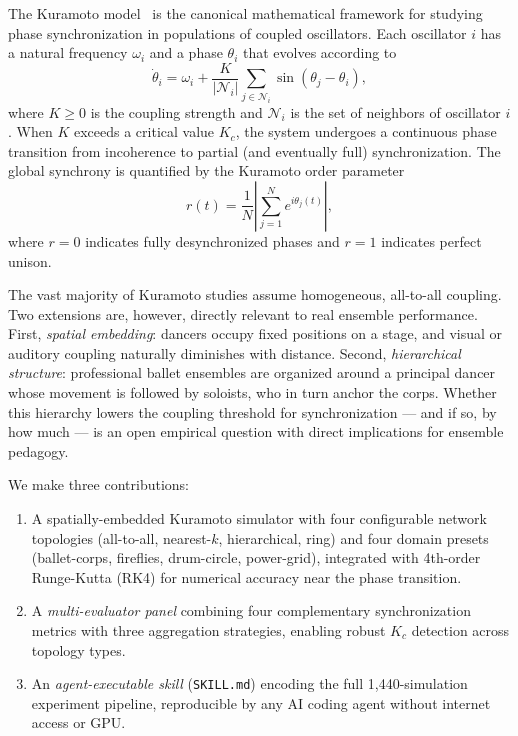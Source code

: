 \documentclass[11pt]{article}
\begin{document}
The Kuramoto model~\cite{kuramoto1975self} is the canonical mathematical framework for
studying phase synchronization in populations of coupled oscillators. Each oscillator
$i$ has a natural frequency $\omega_i$ and a phase $\theta_i$ that evolves according to
\begin{equation}
  \dot{\theta}_i = \omega_i + \frac{K}{|{\mathcal{N}_i}|}
  \sum_{j \in \mathcal{N}_i} \sin(\theta_j - \theta_i),
  \label{eq:kuramoto}
\end{equation}
where $K \geq 0$ is the coupling strength and $\mathcal{N}_i$ is the set of neighbors
of oscillator $i$. When $K$ exceeds a critical value $K_c$, the system undergoes a
continuous phase transition from incoherence to partial (and eventually full)
synchronization. The global synchrony is quantified by the Kuramoto order parameter
\begin{equation}
  r(t) = \frac{1}{N} \left| \sum_{j=1}^{N} e^{i\theta_j(t)} \right|,
  \label{eq:order_parameter}
\end{equation}
where $r = 0$ indicates fully desynchronized phases and $r = 1$ indicates perfect
unison.

The vast majority of Kuramoto studies assume homogeneous, all-to-all coupling. Two
extensions are, however, directly relevant to real ensemble performance. First,
\emph{spatial embedding}: dancers occupy fixed positions on a stage, and visual or
auditory coupling naturally diminishes with distance. Second, \emph{hierarchical
structure}: professional ballet ensembles are organized around a principal dancer whose
movement is followed by soloists, who in turn anchor the corps. Whether this hierarchy
lowers the coupling threshold for synchronization --- and if so, by how much --- is an
open empirical question with direct implications for ensemble pedagogy.

We make three contributions:
\begin{enumerate}
  \item A spatially-embedded Kuramoto simulator with four configurable network
    topologies (all-to-all, nearest-$k$, hierarchical, ring) and four domain presets
    (ballet-corps, fireflies, drum-circle, power-grid), integrated with 4th-order
    Runge-Kutta (RK4) for numerical accuracy near the phase transition.
  \item A \emph{multi-evaluator panel} combining four complementary synchronization
    metrics with three aggregation strategies, enabling robust $K_c$ detection across
    topology types.
  \item An \emph{agent-executable skill} (\texttt{SKILL.md}) encoding the full
    1,440-simulation experiment pipeline, reproducible by any AI coding agent without
    internet access or GPU.
\end{enumerate}
\end{document}

